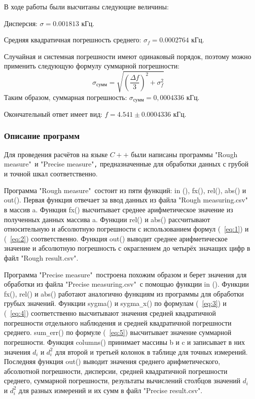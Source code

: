 В ходе работы были высчитаны следующие величины:

Дисперсия: $\sigma=0.001813$ кГц.

Средняя квадратичная погрешность среднего: $\sigma_f=0.0002764$ кГц.

Случайная и системная погрешности имеют одинаковый порядок, поэтому можно применить следующую формулу суммарной погрешности:
\begin{equation}
\label{eq:5}
\sigma_{сумм}=\sqrt{(\frac{\Delta f}{3})^2+\sigma_f^2}
\end{equation}
Таким образом, суммарная погрешность: $\sigma_{сумм}=0,0004336$ кГц.

Окончательный ответ имеет вид: $f=4.541\pm0.0004336$ кГц.

\subsubsection{Описание программ}
Для проведения расчётов на языке $C++$ были написаны программы "Rough measure"\verb| |и "Precise measure"\verb|,| предназначенные для обработки данных с грубой и точной шкал соответственно.

Программа "Rough measure"\verb| |состоит из пяти функций: in (), fx(), rel(), abs() и out(). Первая функция отвечает за ввод данных из файла "Rough measuring.csv"\verb| |в массив a. Функция fx() высчитывает среднее арифметическое значение из полученных данных массива a. Функции rel() и abs() рассчитывают относительную и абсолютную погрешности с использованием формул (~\ref{eq:1}) и (~\ref{eq:2}) соответственно. Функция out() выводит среднее арифметическое значение и абсолютную погрешность с окраглением до четырёх значащих цифр в файл "Rough result.csv".

Программа "Precise measure"\verb| |построена похожим образом и берет значения для обработки из файла "Precise measuring.csv"\verb| |с помощью функции in (). Функции fx(), rel() и abs() работают аналогично функциям из программы для обработки грубых значений. Функции sygma() и sygma\verb|_|x() по формулам (~\ref{eq:3}) и (~\ref{eq:4}) соответственно высчитывают значения средней квадратичной погрешности отдельного наблюдения и средней квадратичной погрешности среднего. sum\verb|_|err() по формуле (~\ref{eq:5}) высчитывает значение суммарной погрешности. Функция columns() принимает массивы b и c и записывает в них значения $d_i$ и $d_i^2$ для второй и третьей колонок в таблице для точных измерений. Последняя функция out() выводит значения среднего арифметического, абсолютной погрешности, дисперсии, средней квадратичной погрешности среднего, суммарной погрешности, результаты вычислений столбцов значений $d_i$ и $d_i^2$ для разных измерений и их сумм в файл "Precise result.csv".


